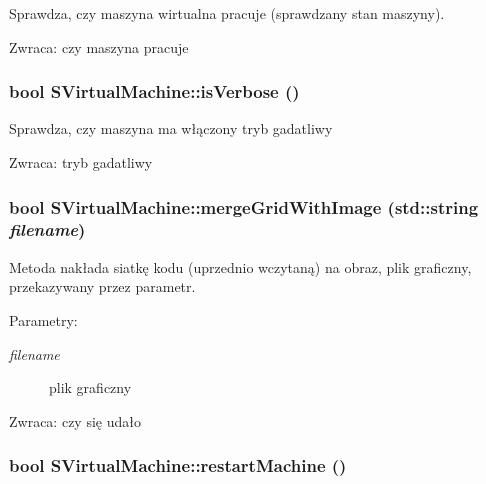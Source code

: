 Sprawdza, czy maszyna wirtualna pracuje (sprawdzany stan maszyny). \begin{Desc}
\item[Zwraca:]czy maszyna pracuje \end{Desc}
\hypertarget{classSVirtualMachine_38d1e09d68d418ce34ae46d6a9dbb6dd}{
\subsubsection[{isVerbose}]{\setlength{\rightskip}{0pt plus 5cm}bool SVirtualMachine::isVerbose ()}}
\label{classSVirtualMachine_38d1e09d68d418ce34ae46d6a9dbb6dd}


Sprawdza, czy maszyna ma włączony tryb gadatliwy \begin{Desc}
\item[Zwraca:]tryb gadatliwy \end{Desc}
\hypertarget{classSVirtualMachine_0257c841ecfbb17f2c85ffd2d8764de8}{
\subsubsection[{mergeGridWithImage}]{\setlength{\rightskip}{0pt plus 5cm}bool SVirtualMachine::mergeGridWithImage (std::string {\em filename})}}
\label{classSVirtualMachine_0257c841ecfbb17f2c85ffd2d8764de8}


Metoda nakłada siatkę kodu (uprzednio wczytaną) na obraz, plik graficzny, przekazywany przez parametr. \begin{Desc}
\item[Parametry:]
\begin{description}
\item[{\em filename}]plik graficzny \end{description}
\end{Desc}
\begin{Desc}
\item[Zwraca:]czy się udało \end{Desc}
\hypertarget{classSVirtualMachine_5be1048d2d6f330994a10032d9609277}{
\subsubsection[{restartMachine}]{\setlength{\rightskip}{0pt plus 5cm}bool SVirtualMachine::restartMachine ()}}
\label{classSVirtualMachine_5be1048d2d6f330994a10032d9609277}


